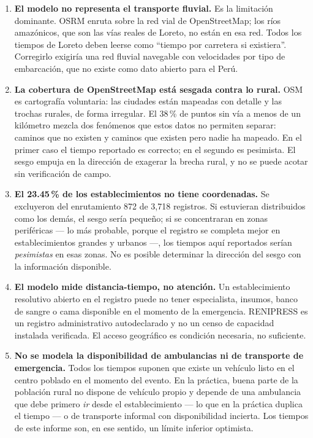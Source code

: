 \documentclass[11pt,a4paper]{article}
\begin{document}
\begin{enumerate}[leftmargin=1.4em]

\item \textbf{El modelo no representa el transporte fluvial.} Es la limitación
dominante. OSRM enruta sobre la red vial de OpenStreetMap; los ríos
amazónicos, que son las vías reales de Loreto, no están en esa red. Todos los
tiempos de Loreto deben leerse como ``tiempo por carretera si existiera''.
Corregirlo exigiría una red fluvial navegable con velocidades por tipo de
embarcación, que no existe como dato abierto para el Perú.

\item \textbf{La cobertura de OpenStreetMap está sesgada contra lo rural.} OSM
es cartografía voluntaria: las ciudades están mapeadas con detalle y las
trochas rurales, de forma irregular. El 38\,\% de puntos sin vía a menos de un
kilómetro mezcla dos fenómenos que estos datos no permiten separar: caminos
que no existen y caminos que existen pero nadie ha mapeado. En el primer caso
el tiempo reportado es correcto; en el segundo es pesimista. El sesgo empuja
en la dirección de exagerar la brecha rural, y no se puede acotar sin
verificación de campo.

\item \textbf{El 23.45\,\% de los establecimientos no tiene coordenadas.} Se
excluyeron del enrutamiento 872 de 3{,}718 registros. Si estuvieran
distribuidos como los demás, el sesgo sería pequeño; si se concentraran en
zonas periféricas --- lo más probable, porque el registro se completa mejor en
establecimientos grandes y urbanos ---, los tiempos aquí reportados serían
\emph{pesimistas} en esas zonas. No es posible determinar la dirección del
sesgo con la información disponible.

\item \textbf{El modelo mide distancia-tiempo, no atención.} Un establecimiento
resolutivo abierto en el registro puede no tener especialista, insumos, banco
de sangre o cama disponible en el momento de la emergencia. RENIPRESS es un
registro administrativo autodeclarado y no un censo de capacidad instalada
verificada. El acceso geográfico es condición necesaria, no suficiente.

\item \textbf{No se modela la disponibilidad de ambulancias ni de transporte
de emergencia.} Todos los tiempos suponen que existe un vehículo listo en el
centro poblado en el momento del evento. En la práctica, buena parte de la
población rural no dispone de vehículo propio y depende de una ambulancia que
debe primero \emph{ir} desde el establecimiento --- lo que en la práctica
duplica el tiempo --- o de transporte informal con disponibilidad incierta. Los
tiempos de este informe son, en ese sentido, un límite inferior optimista.


\end{enumerate}
\end{document}
